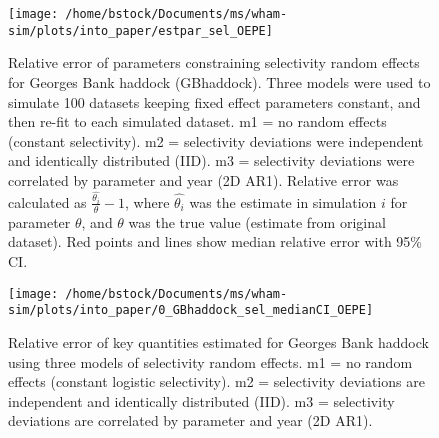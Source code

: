 \documentclass[]{article}
\begin{document}
\pagebreak

\begin{figure}

{\centering \texttt{[image: /home/bstock/Documents/ms/wham-sim/plots/into\_paper/estpar\_sel\_OEPE]} 

}

\caption{Relative error of parameters constraining selectivity random effects for Georges Bank haddock (GBhaddock). Three models were used to simulate 100 datasets keeping fixed effect parameters constant, and then re-fit to each simulated dataset. m1 = no random effects (constant selectivity). m2 = selectivity deviations were independent and identically distributed (IID). m3 = selectivity deviations were correlated by parameter and year (2D AR1). Relative error was calculated as $\frac{\hat{\theta_i}}{\theta} - 1$, where $\hat{\theta_i}$ was the estimate in simulation $i$ for parameter $\theta$, and $\theta$ was the true value (estimate from original dataset). Red points and lines show median relative error with 95\% CI.}\label{fig:estpar-sel}
\end{figure}

\pagebreak

\begin{figure}

{\centering \texttt{[image: /home/bstock/Documents/ms/wham-sim/plots/into\_paper/0\_GBhaddock\_sel\_medianCI\_OEPE]} 

}

\caption{Relative error of key quantities estimated for Georges Bank haddock using three models of selectivity random effects. m1 = no random effects (constant logistic selectivity). m2 = selectivity deviations are independent and identically distributed (IID). m3 = selectivity deviations are correlated by parameter and year (2D AR1).}\label{fig:rel-error-GBhaddock-sel}
\end{figure}

\pagebreak
\end{document}
